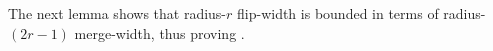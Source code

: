 








The next lemma shows that radius-$r$ flip-width is bounded in terms of radius-$(2r-1)$ merge-width, thus proving .




